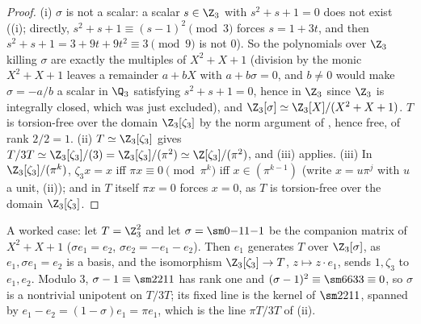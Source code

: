 \begin{proof}
(i) $\sigma$ is not a scalar: a scalar $s\in\Z_3$ with $s^2+s+1=0$ does not exist ((i); directly, $s^2+s+1\equiv(s-1)^2\pmod3$ forces
$s=1+3t$, and then $s^2+s+1=3+9t+9t^2\equiv3\pmod9$ is not $0$). So the polynomials over $\Z_3$ killing $\sigma$ are exactly the multiples of $X^2+X+1$ (division
by the monic $X^2+X+1$ leaves a remainder $a+bX$ with $a+b\sigma=0$, and $b\ne0$ would make $\sigma=-a/b$ a scalar in $\Q_3$ satisfying $s^2+s+1=0$, hence in $\Z_3$ since $\Z_3$ is integrally closed, which was just excluded), and
$\Z_3[\sigma]\simeq\Z_3[X]/(X^2+X+1)$. $T$ is torsion-free over the domain $\Z_3[\zeta_3]$ by the norm argument of , hence
free, of rank $2/2=1$. (ii) $T\simeq\Z_3[\zeta_3]$ gives $T/3T\simeq\Z_3[\zeta_3]/(3)=\Z_3[\zeta_3]/(\pi^2)\simeq\Z[\zeta_3]/(\pi^2)$, and (iii)
applies. (iii) In $\Z_3[\zeta_3]/(\pi^k)$, $\zeta_3x=x$ iff $\pi x\equiv0\pmod{\pi^k}$ iff $x\in(\pi^{k-1})$ (write $x=u\pi^j$ with $u$ a unit,
(ii)); and in $T$ itself $\pi x=0$ forces $x=0$, as $T$ is torsion-free over the domain $\Z_3[\zeta_3]$.
\end{proof}

A worked case: let $T=\Z_3^2$ and let $\sigma=\sm0{-1}1{-1}$ be the companion matrix of $X^2+X+1$ ($\sigma e_1=e_2$, $\sigma e_2=-e_1-e_2$). Then $e_1$ generates $T$
over $\Z_3[\sigma]$, as $e_1,\sigma e_1=e_2$ is a basis, and the isomorphism $\Z_3[\zeta_3]\to T$, $z\mapsto z\cdot e_1$, sends $1,\zeta_3$ to $e_1,e_2$. Modulo $3$,
$\sigma-1\equiv\sm2211$ has rank one and $(\sigma-1)^2\equiv\sm6633\equiv0$, so $\sigma$ is a nontrivial unipotent on $T/3T$; its fixed line is the kernel of
$\sm2211$, spanned by $e_1-e_2=(1-\sigma)e_1=\pi e_1$, which is the line $\pi T/3T$ of (ii).


